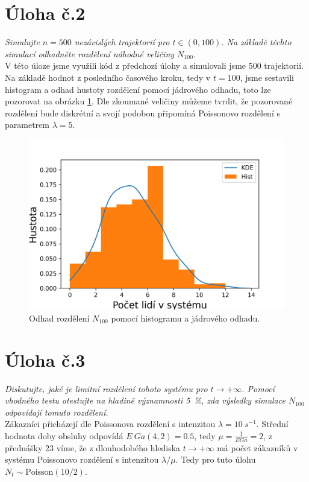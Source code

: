 \documentclass[czech]{mvi-report}
\begin{document}
\section{Úloha č.2}
\textit{Simulujte $n = 500$ nezávislých trajektorií pro $t\in(0,100)$. Na základě těchto simulací odhadněte rozdělení náhodné veličiny $N_{100}$.}\\

V této úloze jsme využili kód z předchozí úlohy a simulovali jsme 500 trajektorií. Na základě hodnot z posledního časového kroku, tedy v $ t=100 $, jsme sestavili histogram a odhad hustoty rozdělení pomocí jádrového odhadu, toto lze pozorovat na obrázku \ref{fig:histkde}. Dle zkoumané veličiny můžeme tvrdit, že pozorované rozdělení bude diskrétní a svojí podobou připomíná Poissonovo rozdělení s parametrem $ \lambda = 5 $.

\begin{figure}
\includegraphics[width=\columnwidth]{img/histkde.png} 
\caption{ Odhad rozdělení $ N_{100} $ pomocí histogramu a jádrového odhadu.}
\label{fig:histkde} 
\end{figure}

\section{Úloha č.3}
\textit{Diskutujte, jaké je limitní rozdělení tohoto systému pro $t\to+\infty$. Pomocí vhodného testu otestujte na hladině významnosti 5~\%, zda výsledky simulace $N_{100}$ odpovídají tomuto rozdělení.}\\

Zákazníci přicházejí dle Poissonova rozdělení s intenzitou $ \lambda = 10~s^{-1} $. Střední hodnota doby obsluhy odpovídá $ E~Ga(4,2) = 0.5 $, tedy $ \mu=\frac{1}{E Ga}=2 $, z přednášky 23 víme, že z dlouhodobého hlediska $  t \to +\infty $ má počet zákazníků v systému Poissonovo rozdělení s intenzitou $ \lambda/\mu $. Tedy pro tuto úlohu $ N_t \sim \textrm{Poisson}(10/2) $.
\end{document}
